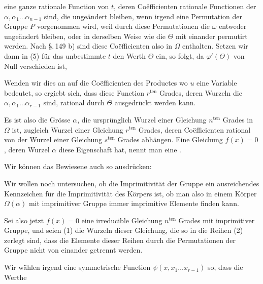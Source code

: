 
eine ganze rationale Function von $t$, deren Co\"efficienten rationale
Functionen der $\alpha, \alpha_1 \ldots \alpha_{n-1}$ sind, die ungeändert bleiben,
wenn irgend eine Permutation der Gruppe $P$ vorgenommen wird,
weil durch diese Permutationen die $\omega$ entweder ungeändert
bleiben, oder in derselben Weise wie die $\Theta$ mit einander permutirt werden. Nach \S.\,149 b) sind diese Co\"efficienten also in $\Omega$
enthalten. Setzen wir dann in (5) für das unbestimmte $t$ den
Werth $\Theta$ ein, so folgt, da $\varphi'(\Theta)$ von Null verschieden ist,

Wenden wir dies an auf die Co\"efficienten des Productes
wo $u$ eine Variable bedeutet, so ergiebt sich, dass diese Function
$r^{\text{ten}}$ Grades, deren Wurzeln die $\alpha, \alpha_1 \ldots \alpha_{r-1}$ sind, rational
durch $\Theta$ ausgedrückt werden kann.

Es ist also die Grösse $\alpha$, die ursprünglich Wurzel einer
Gleichung $n^{\text{ten}}$ Grades in $\Omega$ ist, zugleich Wurzel einer Gleichung
$r^{\text{ten}}$ Grades, deren Co\"efficienten rational von der Wurzel einer
Gleichung $s^{\text{ten}}$ Grades abhängen. Eine Gleichung $f(x) = 0$,
deren Wurzel $\alpha$ diese Eigenschaft hat, nennt man eine .

Wir können das Bewiesene auch so ausdrücken:


Wir wollen noch untersuchen, ob die Imprimitivität der
Gruppe ein ausreichendes Kennzeichen für die Imprimitivität des
Körpers ist, ob man also in einem Körper $\Omega(\alpha)$ mit imprimitiver
Gruppe immer imprimitive Elemente finden kann.

Sei also jetzt $f(x) = 0$ eine irreducible Gleichung $n^{\text{ten}}$
Grades mit imprimitiver Gruppe, und seien (1) die Wurzeln
dieser Gleichung, die so in die Reihen (2) zerlegt sind, dass die
Elemente dieser Reihen durch die Permutationen der Gruppe
nicht von einander getrennt werden.

Wir wählen irgend eine symmetrische Function $\psi(x, x_1 \ldots x_{r-1})$
so, dass die Werthe
